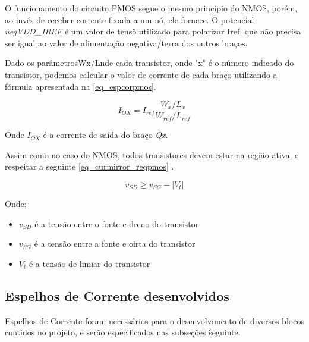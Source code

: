 O funcionamento do circuito PMOS segue o mesmo principio do NMOS, porém, ao inv\'es de receber corrente fixada a um n\'o, ele fornece. O potencial \emph{negVDD\_IREF} \'e um valor de tens\~o utilizado para polarizar Iref, que n\~ao precisa ser igual ao valor de alimenta{\c c}\~ao negativa/terra dos outros bra{\c c}os.

Dado os parâmetrosWx/Lnde cada transistor, onde "x" é o número indicado do transistor, podemos calcular o valor de corrente de cada braço utilizando a fórmula apresentada na \autoref{eq_espcorpmos}.

\begin{equation}
    \label{eq_espcorpmos}
    I_{OX} = I_{ref}\frac{W_x/L_x}{W_{ref}/L_{ref}}
\end{equation}

Onde $I_{OX}$ \'e a corrente de sa\'ida do bra{\c c}o \emph{Qx}. 

Assim como no caso do NMOS, todos transistores devem estar na regi\~ao ativa, e respeitar a seguinte \autoref{eq_curmirror_reqpmos} \cite{RazaviFundM}.

\begin{equation}
    \label{eq_curmirror_reqpmos}
    v_{SD} \geq v_{SG} - |V_t|
\end{equation}

Onde:

\begin{itemize}
    \item $v_{SD}$ \'e a tens\~ao entre o fonte e dreno do transistor
    \item $v_{SG}$ \'e a tens\~ao entre a fonte e oirta do transistor
    \item $V_{t}$ \'e a tens\~ao de limiar do transistor
\end{itemize}

\subsection{Espelhos de Corrente desenvolvidos}

Espelhos de Corrente foram necess\'arios para o desenvolvimento de diversos blocos contidos no projeto, e ser\~ao especificados nas subse{\c c}\~oes \` seguinte.

\newcommand{\NomeBlocoNoUnderline}{NULL}
\newcommand{\NomeQTab}{NULL}

